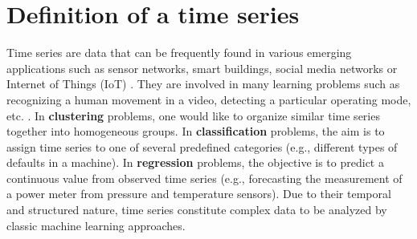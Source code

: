 

\section{Definition of a time series}
Time series are data that 
can be frequently found in various emerging applications such as sensor networks, smart buildings, social media networks or Internet of Things (IoT) \cite{Najmeddine2012,Nguyen2012,Yin2008}. They are involved in many learning problems such as recognizing a human movement in a video, detecting a particular operating mode, etc.  \cite{PANAGIOTAKIS2008,Ramasso2008}. In \textbf{clustering} problems, one would like to organize similar time series together into homogeneous groups. In \textbf{classification} problems, the aim is to assign time series to one of several predefined categories (e.g., different types of defaults in a machine). In \textbf{regression} problems, the objective is to predict a continuous value from observed time series (e.g., forecasting the measurement of a power meter from pressure and temperature sensors). Due to their temporal and structured nature, time series constitute complex data to be analyzed by classic machine learning approaches.

